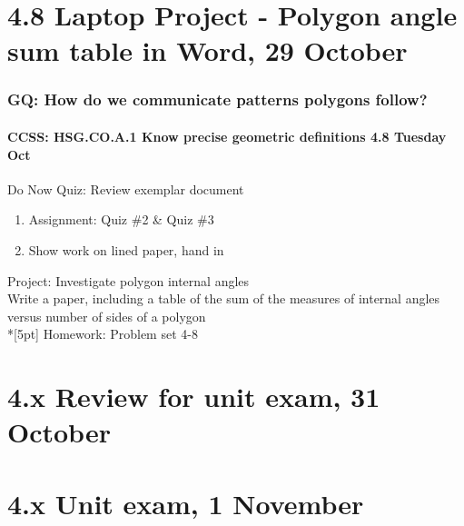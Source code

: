 \documentclass{beamer}
\begin{document}
\section{4.8 Laptop Project - Polygon angle sum table in Word, 29 October}
\frame
{
\frametitle{GQ: How do we communicate patterns polygons follow?}
\framesubtitle{CCSS: HSG.CO.A.1 Know precise geometric definitions \hfill \alert{4.8 Tuesday Oct}}

\begin{block}{Do Now Quiz: Review exemplar document}
\begin{enumerate}
  \item Assignment: Quiz \#2 \& Quiz \#3
  \item Show work on lined paper, hand in
\end{enumerate}
\end{block}
Project: Investigate polygon internal angles\\
Write a paper, including a table of the sum of the measures of internal angles versus number of sides of a polygon \\*[5pt]
Homework: Problem set 4-8
}

\section{4.x Review for unit exam, 31 October}

\section{4.x Unit exam, 1 November}
\end{document}
